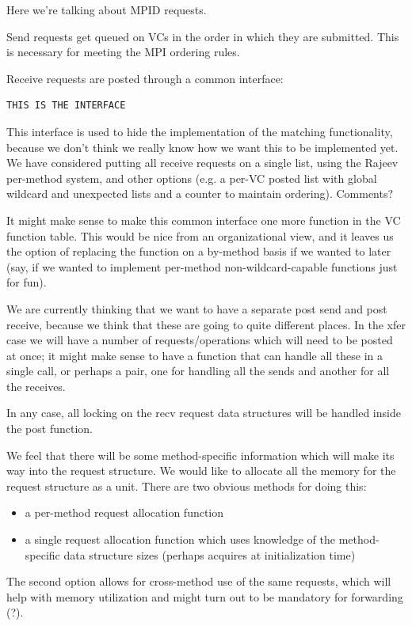 \documentclass[11pt,letterpaper]{article}
\begin{document}
Here we're talking about MPID requests.

Send requests get queued on VCs in the order in which they are submitted.  This
is necessary for meeting the MPI ordering rules.

Receive requests are posted through a common interface:
\begin{verbatim}
THIS IS THE INTERFACE
\end{verbatim}
This interface is used to hide the implementation of the matching
functionality, because we don't think we really know how we want this to be
implemented yet.  We have considered putting all receive requests on a single
list, using the Rajeev per-method system, and other options (e.g. a per-VC
posted list with global wildcard and unexpected lists and a counter to
maintain ordering).  Comments?

It might make sense to make this common interface one more function in the VC
function table.  This would be nice from an organizational view, and it leaves
us the option of replacing the function on a by-method basis if we wanted to
later (say, if we wanted to implement per-method non-wildcard-capable functions
just for fun).

We are currently thinking that we want to have a separate post send and post
receive, because we think that these are going to quite different places.  In
the xfer case we will have a number of requests/operations which will need to
be posted at once; it might make sense to have a function that can handle all
these in a single call, or perhaps a pair, one for handling all the sends and
another for all the receives.

In any case, all locking on the recv request data structures will be handled
inside the post function.

We feel that there will be some method-specific information which will make its
way into the request structure.  We would like to allocate all the memory for the request structure as a unit.  There are two obvious methods for doing this:
\begin{itemize}
\item a per-method request allocation function
\item a single request allocation function which uses knowledge of the
  method-specific data structure sizes (perhaps acquires at initialization
  time)
\end{itemize}
The second option allows for cross-method use of the same requests, which will
help with memory utilization and might turn out to be mandatory for forwarding
(?).
\end{document}
